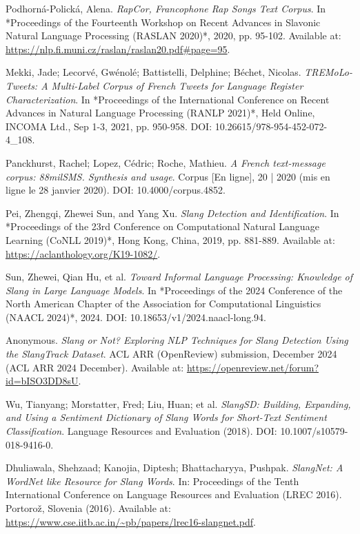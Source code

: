 \documentclass[12pt]{article}
\begin{document}
\begin{thebibliography}{9}
Podhorná-Polická, Alena.  
\textit{RapCor, Francophone Rap Songs Text Corpus}.  
In *Proceedings of the Fourteenth Workshop on Recent Advances in Slavonic Natural Language Processing (RASLAN 2020)*, 2020, pp. 95-102.  
Available at: \url{https://nlp.fi.muni.cz/raslan/raslan20.pdf#page=95}.  %

Mekki, Jade; Lecorvé, Gwénolé; Battistelli, Delphine; Béchet, Nicolas.  
\textit{TREMoLo-Tweets: A Multi-Label Corpus of French Tweets for Language Register Characterization}.  
In *Proceedings of the International Conference on Recent Advances in Natural Language Processing (RANLP 2021)*, Held Online, INCOMA Ltd., Sep 1-3, 2021, pp. 950-958.  
DOI: 10.26615/978-954-452-072-4\_108.  

Panckhurst, Rachel; Lopez, Cédric; Roche, Mathieu.  
\textit{A French text-message corpus: 88milSMS. Synthesis and usage}.  
Corpus [En ligne], 20 | 2020 (mis en ligne le 28 janvier 2020).  
DOI: 10.4000/corpus.4852.  

Pei, Zhengqi, Zhewei Sun, and Yang Xu.  
\textit{Slang Detection and Identification}.  
In *Proceedings of the 23rd Conference on Computational Natural Language Learning (CoNLL 2019)*, Hong Kong, China, 2019, pp. 881-889.  
Available at: \url{https://aclanthology.org/K19-1082/}.  %

Sun, Zhewei, Qian Hu, et al.  
\textit{Toward Informal Language Processing: Knowledge of Slang in Large Language Models}.  
In *Proceedings of the 2024 Conference of the North American Chapter of the Association for Computational Linguistics (NAACL 2024)*, 2024.  
DOI: 10.18653/v1/2024.naacl-long.94.  

Anonymous.  
\textit{Slang or Not? Exploring NLP Techniques for Slang Detection Using the SlangTrack Dataset}.  
ACL ARR (OpenReview) submission, December 2024 (ACL ARR 2024 December).  
Available at: \url{https://openreview.net/forum?id=bISO3DD8sU}.

Wu, Tianyang; Morstatter, Fred; Liu, Huan; et al.  
\textit{SlangSD: Building, Expanding, and Using a Sentiment Dictionary of Slang Words for Short-Text Sentiment Classification}.  
Language Resources and Evaluation (2018).  
DOI: 10.1007/s10579-018-9416-0.  

Dhuliawala, Shehzaad; Kanojia, Diptesh; Bhattacharyya, Pushpak.  
\textit{SlangNet: A WordNet like Resource for Slang Words}.  
In: Proceedings of the Tenth International Conference on Language Resources and Evaluation (LREC 2016).  
Portorož, Slovenia (2016).  
Available at: \url{https://www.cse.iitb.ac.in/~pb/papers/lrec16-slangnet.pdf}.


\end{thebibliography}
\end{document}
